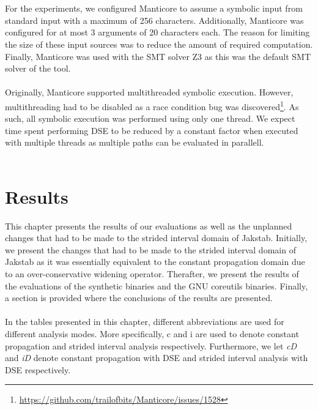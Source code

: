 \documentclass{kththesis}
\newcommand{\fbcomment}[1]{{#1}}
\renewcommand{\fbcomment}[1]{}
\renewcommand{\it}[1]{\textit{#1}}
\begin{document}
\\ \\
For the experiments, we configured Manticore to assume a symbolic input from standard input with a maximum of 256 characters. Additionally, Manticore was configured for at most 3 arguments of 20 characters each. The reason for limiting the size of these input sources was to reduce the amount of required computation. Finally, Manticore was used with the SMT solver Z3 as this was the default SMT solver of the tool.
\\ \\
Originally, Manticore supported multithreaded symbolic execution. However, multithreading had to be disabled as a race condition bug was discovered\footnote{\url{https://github.com/trailofbits/Manticore/issues/1528}}. As such, all symbolic execution was performed using only one thread. We expect time spent performing DSE to be reduced by a constant factor when executed with multiple threads as multiple paths can be evaluated in parallell.
\\ \\

\chapter{Results}\label{chap:results}
\fbcomment{\color{red}Goal: Present the most "interesting" results of the project(Full tables will be put in an appendix).}
This chapter presents the results of our evaluations as well as the unplanned changes that had to be made to the strided interval domain of Jakstab. Initially, we present the changes that had to be made to the strided interval domain of Jakstab as it was essentially equivalent to the constant propagation domain due to an over-conservative widening operator. Therafter, we present the results of the evaluations of the synthetic binaries and the GNU coreutils binaries. Finally, a section is provided where the conclusions of the results are presented.
\\ \\
In the tables presented in this chapter, different abbreviations are used for different analysis modes. More specifically, c and i are used to denote constant propagation and strided interval analysis respectively. Furthermore, we let \it{cD} and \it{iD} denote constant propagation with DSE and strided interval analysis with DSE respectively.
\end{document}
